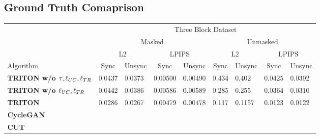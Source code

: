 \documentclass{article}
\begin{document}
	\subsection{Ground Truth Comaprison}
\begin{table}[H]
	\begin{tabular}{l|llllllll}
		& \multicolumn{8}{c}{Three Block Dataset}                                                                                                                                                                                              \\
		& \multicolumn{4}{c|}{Masked}                                                                                       & \multicolumn{4}{c}{Unmasked}                                                                                     \\
		& \multicolumn{2}{c|}{L2}                                 & \multicolumn{2}{c|}{LPIPS}                              & \multicolumn{2}{c|}{L2}                                 & \multicolumn{2}{c}{LPIPS}                              \\
		Algorithm                              & \multicolumn{1}{c|}{Sync} & \multicolumn{1}{c|}{Unsync} & \multicolumn{1}{c|}{Sync} & \multicolumn{1}{c|}{Unsync} & \multicolumn{1}{c|}{Sync} & \multicolumn{1}{c|}{Unsync} & \multicolumn{1}{c|}{Sync} & \multicolumn{1}{c}{Unsync} \\ \hline
		\textbf{TRITON w/o $\tau, \ell_{UC}, \ell_{TR}$} & 0.0437                    & 0.0373                      & 0.00500                   & 0.00490                     & 0.434                     & 0.402                       & 0.0425                    & 0.0392                     \\
		\textbf{TRITON w/o $\ell_{UC}, \ell_{TR}$}       & 0.0442                    & 0.0386                      & 0.00586                   & 0.00589                     & 0.285                     & 0.255                       & 0.0364                    & 0.0310                     \\
		\textbf{TRITON}                        & 0.0286                    & 0.0267                      & 0.00479                   & 0.00478                     & 0.117                     & 0.1157                      & 0.0123                    & 0.0122                     \\
		\textbf{CycleGAN}                      &                           &                             &                           &                             &                           &                             &                           &                            \\
		\textbf{CUT}                           &                           &                             &                           &                             &                           &                             &                           &                           
	\end{tabular}
\end{table}
\end{document}
